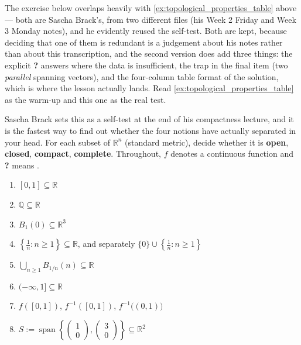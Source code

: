 \begin{ainote}
The exercise below overlaps heavily with \cref{ex:topological_properties_table} above --- both
are Sascha Brack's, from two different files (his Week 2 Friday and Week 3 Monday notes), and
he evidently reused the self-test. Both are kept, because deciding that one of them is redundant
is a judgement about his notes rather than about this transcription, and the second version does
add three things: the explicit \textbf{?} answers where the data is insufficient, the trap in
the final item (two \emph{parallel} spanning vectors), and the four-column table format of the
solution, which is where the lesson actually lands. Read
\cref{ex:topological_properties_table} as the warm-up and this one as the real test.
\end{ainote}

\begin{exercise}
\label{ex:classification_table}
Sascha Brack sets this as a self-test at the end of his compactness lecture, and it is the
fastest way to find out whether the four notions have actually separated in your head. For each
subset of $\mathbb{R}^n$ (standard metric), decide whether it is \textbf{open}, \textbf{closed},
\textbf{compact}, \textbf{complete}. Throughout, $f$ denotes a continuous function and
\textbf{?} means .
\begin{enumerate}[label=\textbf{\arabic*.}]
  \item $[0,1] \subseteq \mathbb{R}$
  \item $\mathbb{Q} \subseteq \mathbb{R}$
  \item $B_1(0) \subseteq \mathbb{R}^3$
  \item $\left\{\tfrac1n : n \geq 1\right\} \subseteq \mathbb{R}$, and separately
    $\{0\} \cup \left\{\tfrac1n : n \geq 1\right\}$
  \item $\bigcup_{n\geq1}B_{1/n}(n) \subseteq \mathbb{R}$
  \item $(-\infty,1] \subseteq \mathbb{R}$
  \item $f([0,1])$, \quad $f^{-1}([0,1])$, \quad $f^{-1}\big((0,1)\big)$
  \item $S := \operatorname{span}\!\left\{\begin{pmatrix}1\\0\end{pmatrix},
    \begin{pmatrix}3\\0\end{pmatrix}\right\} \subseteq \mathbb{R}^2$
\end{enumerate}
\end{exercise}

